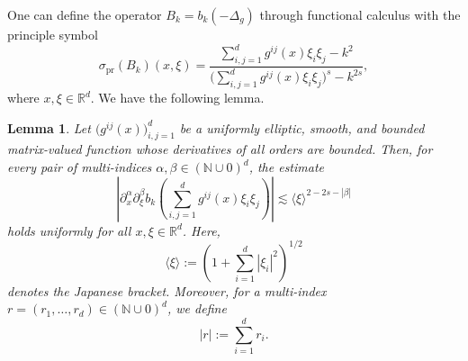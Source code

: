 \documentclass[12pt]{amsart}
\numberwithin{equation}{section}
\newtheorem{lem}[thm]{Lemma}
\theoremstyle{definition}
\theoremstyle{remark}
\numberwithin{equation}{section}
\begin{document}
	One can define the operator $B_k=b_k(-\Delta_g)$ through  functional calculus with the principle symbol 
	\[
	\sigma_{\mathrm{pr}}(B_k)(x,\xi)
	=
	\frac{\sum_{i,j=1}^d g^{ij}(x)\xi_i\xi_j-k^2}
	{\bigl(\sum_{i,j=1}^d g^{ij}(x)\xi_i\xi_j\bigr)^s-k^{2s}},
	\]
	where $x,\xi\in \mathbb{R}^d$. We have the following lemma.
	\begin{lem}\label{towards functional calculus}
		Let $\bigl(g^{ij}(x)\bigr)_{i,j=1}^{d}$ be a uniformly elliptic, smooth, and bounded matrix-valued function whose derivatives of all orders are bounded. Then, for every pair of multi-indices $\alpha,\beta\in (\mathbb{N}\cup{0})^{d}$, the estimate
		\[
		\left|\partial_x^{\alpha}\partial_{\xi}^{\beta} b_k\left(\sum_{i,j=1}^d g^{ij}(x)\xi_i\xi_j\right)\right|
		\lesssim
		\langle \xi\rangle^{2-2s-|\beta|}
		\]
		holds uniformly for all $x,\xi\in\mathbb{R}^{d}$. Here,
		\[
		\langle \xi\rangle
		:=
		\left(1+\sum_{i=1}^{d}|\xi_i|^2\right)^{1/2}
		\]
		denotes the Japanese bracket. Moreover, for a multi-index
		$r=(r_1,\ldots,r_d)\in(\mathbb{N}\cup{0})^d$,
		we define
		\[
		|r|:=\sum_{i=1}^{d} r_i.
		\]
	\end{lem}
\end{document}
